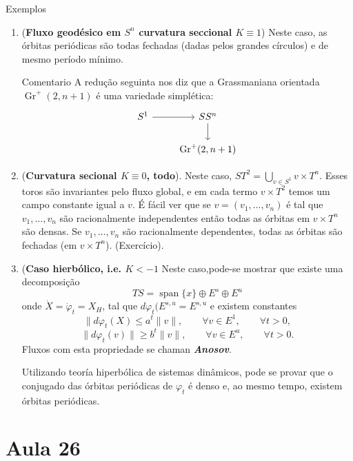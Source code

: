 \begin{thing4}{Exemplos}
\begin{enumerate}
\begin{enumerate}
\item (\textbf{Fluxo geodésico em $S^n$ curvatura seccional $K\equiv 1$})\hspace{1em} Neste caso, as órbitas periódicas são todas fechadas (dadas pelos grandes círculos) e de mesmo período mínimo.

	\begin{thing4}{Comentario}\leavevmode
		A redução seguinta nos diz que a Grassmaniana orientada $\operatorname{Gr}^+(2,n+1)$ é uma variedade simplética:
		\[\begin{tikzcd}
			S^1\arrow[r]& S S^n\arrow[d]\\
			&\operatorname{Gr}^+(2,n+1)
		\end{tikzcd}\]
	\end{thing4}
\item (\textbf{Curvatura secional $K\equiv 0$, todo}).\hspace{1em} Neste caso, $ST^2=\bigcup_{v\in S^1} v\times T^n$. Esses toros são invariantes pelo fluxo global, e em cada termo $v \times T^2$ temos um campo constante igual a $v$. É fácil ver que se $v=(v_1,\ldots,v_n)$ é tal que $v_1,\ldots,v_n$ são racionalmente independentes então todas as órbitas em $v\times T^n$ são densas. Se $v_1,\ldots, v_n$ são racionalmente dependentes, todas as órbitas são fechadas (em $v \times T^n$). {\color{3}(Exercício).}

\item (\textbf{Caso hierbólico, i.e. $K<-1$} \hspace{1em} Neste caso,pode-se mostrar que existe uma decomposição \[TS=\operatorname{s pan}\{x\}\oplus E^s \oplus  E^u\] onde $\dot X=\dot{\varphi}_t=X_H$, tal que  $d\varphi_t(E^{s,u}=E^{s,u}$ e existem constantes 
	\[\|d\varphi_t(X)\leq a^t\|v\|,\qquad \forall v\in E^1,\qquad \forall t>0,\]
	\[\|d\varphi_t(v)\|\geq b^t\|v\|,\qquad \forall v\in E^u,\qquad \forall t>0.\]
Fluxos com esta propriedade se chaman  \textit{\textbf{Anosov}}.

Utilizando teoría hiperbólica de sistemas dinâmicos, pode se provar que o conjugado das órbitas periódicas de $\varphi_t$ é denso e, ao mesmo tempo, existem órbitas periódicas.
\end{enumerate}
\end{enumerate}
\end{thing4}

\section{Aula 26}

